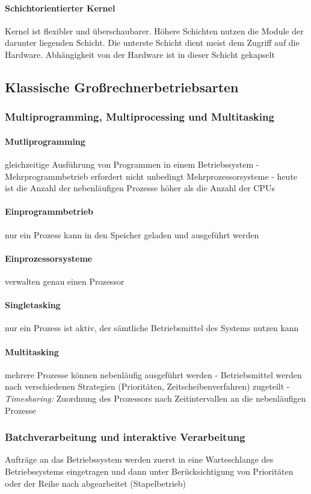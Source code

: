 \documentclass[10pt,a4paper,landscape]{article}
\begin{document}
\begin{multicols*}{3}
	\paragraph{Schichtorientierter Kernel} Kernel ist flexibler und überschaubarer. Höhere Schichten nutzen die Module der darunter liegenden Schicht. Die unterste Schicht dient meist dem Zugriff auf die Hardware. Abhängigkeit von der Hardware ist in dieser Schicht gekapselt
	\subsection{Klassische Großrechnerbetriebsarten}
	\subsubsection{Multiprogramming, Multiprocessing und Multitasking}
	\paragraph{Mutliprogramming} gleichzeitige Ausführung von Programmen in einem Betriebssystem - Mehrprogrammbetrieb erfordert nicht unbedingt Mehrprozessorsysteme - heute ist die Anzahl der nebenläufigen Prozesse höher als die Anzahl der CPUs
	\paragraph{Einprogrammbetrieb} nur ein Prozess kann in den Speicher geladen und ausgeführt werden
	\paragraph{Einprozessorsysteme} verwalten genau einen Prozessor
	\paragraph{Singletasking} nur ein Prozess ist aktiv, der sämtliche Betriebsmittel des Systems nutzen kann
	\paragraph{Multitasking} mehrere Prozesse können nebenläufig ausgeführt werden - Betriebsmittel werden nach verschiedenen Strategien (Prioritäten, Zeitscheibenverfahren) zugeteilt - \textit{Timesharing:} Zuordnung des Prozessors nach Zeitintervallen an die nebenläufigen Prozesse
	\subsubsection{Batchverarbeitung und interaktive Verarbeitung}
	Aufträge an das Betriebssystem werden zuerst in eine Warteschlange des Betriebssystems eingetragen und dann unter Berücksichtigung von Prioritäten oder der Reihe nach abgearbeitet (Stapelbetrieb)

\end{multicols*}
\end{document}
